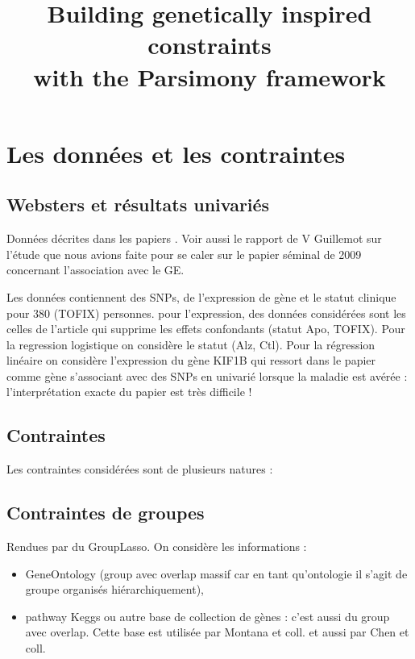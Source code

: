 \documentclass[french]{article}
\begin{document}
\title{Building genetically inspired constraints \\
with the Parsimony framework}
\author{}
\maketitle
\begin{abstract}
\end{abstract}



\section{Les données et les contraintes}
\subsection{Websters et résultats univariés}
Données décrites dans les papiers \cite{Myers2007, Webster2009}.
Voir aussi le rapport de V Guillemot sur l'étude que nous avions faite pour se caler sur le papier séminal de 2009 concernant l'association avec le GE.

Les données contiennent des SNPs, de l'expression de gène et le statut clinique pour 380 (TOFIX) personnes. pour l'expression, des données considérées sont les celles de l'article qui supprime les effets confondants (statut Apo, TOFIX). Pour la regression logistique on considère le statut (Alz, Ctl). Pour la régression linéaire on considère l'expression du gène KIF1B qui ressort dans le papier comme gène s'associant avec des SNPs en univarié lorsque la maladie est avérée : l'interprétation exacte du papier \cite{Webster2009} est très difficile !

\subsection{Contraintes}
Les contraintes considérées sont de plusieurs natures :
\subsection{Contraintes de groupes}
Rendues par du GroupLasso. 
On considère les informations :
\begin{itemize}
	\item  GeneOntology (group avec overlap massif car en tant qu'ontologie il s'agit de groupe organisés hiérarchiquement),
	\item pathway Keggs ou autre base de collection de gènes : c'est aussi du group avec overlap. Cette base est utilisée par Montana et coll. \cite{Silver2012} et aussi par Chen et coll. \cite{Chen2010}
\end{itemize}
\end{document}
